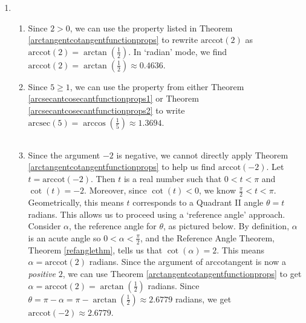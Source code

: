 \documentclass[12pt]{ximera}
\begin{document}
\begin{example}
\begin{enumerate}
\item

\begin{enumerate}

\item  Since $2 > 0$, we can use the property listed in Theorem \ref{arctangentcotangentfunctionprops} to rewrite $\mbox{arccot}(2)$ as $\mbox{arccot}(2) = \arctan\left(\frac{1}{2}\right)$.  In `radian' mode, we find $\mbox{arccot}(2) = \arctan\left(\frac{1}{2}\right) \approx 0.4636$.

\item  Since $5 \geq 1$, we can use the property from either Theorem \ref{arcsecantcosecantfunctionprops1} or Theorem \ref{arcsecantcosecantfunctionprops2} to write $\mbox{arcsec}(5) = \arccos\left(\frac{1}{5}\right) \approx 1.3694$.



\begin{tabular}{cc}


\end{tabular} 

\item  Since the argument $-2$ is negative, we cannot directly apply  Theorem \ref{arctangentcotangentfunctionprops} to help us find  $\mbox{arccot}(-2)$.  Let $t = \mbox{arccot}(-2)$. Then $t$ is a real number such that $0 < t < \pi$ and $\cot(t) = -2$.  Moreover, since $\cot(t) < 0$, we know $\frac{\pi}{2} < t < \pi$.  Geometrically, this means $t$ corresponds to a Quadrant II angle $\theta = t$ radians.  This allows us to proceed using a `reference angle' approach. Consider $\alpha$, the reference angle for $\theta$, as pictured below. By definition, $\alpha$ is an acute angle so  $0 < \alpha < \frac{\pi}{2}$, and the Reference Angle Theorem, Theorem \ref{refanglethm}, tells us that $\cot(\alpha) = 2$.  This means  $\alpha = \mbox{arccot}(2)$ radians.  Since the argument of arccotangent is now a \emph{positive} $2$, we can use  Theorem \ref{arctangentcotangentfunctionprops} to get $\alpha = \mbox{arccot}(2) =\arctan\left(\frac{1}{2}\right)$ radians. Since $\theta = \pi - \alpha =  \pi - \arctan\left(\frac{1}{2}\right) \approx 2.6779$ radians, we get  $\mbox{arccot}(-2) \approx 2.6779$.

\begin{tabular}{m{2.5in}m{1in}m{2.5in}}



\end{tabular}
\end{enumerate}
\end{enumerate}
\end{example}
\end{document}
